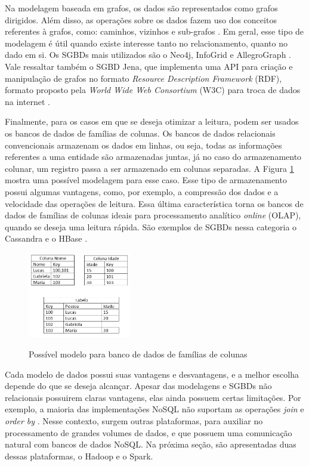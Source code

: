 Na modelagem baseada em grafos, os dados são representados como grafos dirigidos. Além disso, 
as operações sobre os dados fazem uso dos conceitos referentes à grafos, como: caminhos, 
vizinhos e sub-grafos \cite{de2010nosql}. Em geral, esse tipo de modelagem é útil 
quando existe interesse tanto no relacionamento, quanto no dado em si. Os SGBDs mais 
utilizados são o Neo4j, InfoGrid e AllegroGraph \cite{moniruzzaman2013nosql}. Vale ressaltar 
também o SGBD Jena, que implementa uma API para criação e manipulação de grafos no formato 
\textit{Resource Description Framework} (RDF), formato proposto pela \textit{World Wide Web 
Consortium} (W3C) para troca de dados na internet \cite{mcbride2001jena}.

Finalmente, para os casos em que se deseja otimizar a leitura, podem ser usados os bancos de 
dados de famílias de colunas. Os bancos de dados relacionais convencionais armazenam os dados 
em linhas, ou seja, todas as informações referentes a uma entidade são armazenadas juntas, 
já no caso do armazenamento colunar, um registro passa a ser armazenado em colunas separadas. 
A Figura \ref{fig:db-colunar} mostra uma possível modelagem para esse caso. Esse tipo de 
armazenamento possui algumas vantagens, como, por exemplo, a compressão dos dados e a 
velocidade das operações de leitura. Essa última característica torna os bancos de dados de 
famílias de colunas ideais para processamento analítico \textit{online} (OLAP), quando se 
deseja uma leitura rápida. São exemplos de SGBDs nessa categoria o Cassandra e o 
HBase \cite{de2010nosql}.

\begin{figure}[!htb]
    \centering
    \caption{Possível modelo para banco de dados de famílias de colunas}
    \includegraphics[width=0.4\textwidth]{./04-figuras/db-colunar}
    \label{fig:db-colunar}
\end{figure}


Cada modelo de dados possui suas vantagens e desvantagens, e a melhor escolha depende do que 
se deseja alcançar. Apesar das modelagens e SGBDs não relacionais possuirem claras vantagens,  
elas ainda possuem certas limitações. Por exemplo, a maioria das implementações NoSQL não
suportam as operações \textit{join} e \textit{order by} \cite{pokorny2013nosql}. 
Nesse contexto, surgem outras plataformas, para auxiliar no processamento de grandes volumes 
de dados, e que possuem uma comunicação natural com bancos de dados NoSQL. Na próxima seção, 
são apresentadas duas dessas plataformas, o Hadoop e o Spark.

